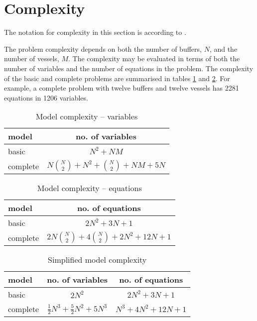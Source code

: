 \section{Complexity}\label{S.complexity}
The notation for complexity in this section is according to \citet{Knuth:1976}.

The problem complexity depends on both the number of buffers, $N$,
and the number of vessels, $M$.
The complexity may be evaluated in terms of both the number of variables and
the number of equations in the problem.
The complexity of the basic and complete problems are summarised in tables
\ref{tbl.complexity1} and \ref{tbl.complexity1b}.
For example, a complete problem with twelve buffers and twelve vessels has
\num{2281} equations in \num{1206} variables.
\begin{table}[t]
    \centering
    \caption{Model complexity -- variables}
    \label{tbl.complexity1}
    \begin{tabular}{l | c }
        model & no. of variables \\ \hline
        basic & $N^2 + NM$\\
        complete & $N {{N}\choose{2}} + N^2 + {{N}\choose{2}} + NM + 5N$\\
    \end{tabular}
\end{table}
\begin{table}[t]
    \centering
    \caption{Model complexity -- equations}
    \label{tbl.complexity1b}
    \begin{tabular}{l | c }
        model & no. of equations\\ \hline
        basic & $2N^2 + 3N + 1$\\
        complete  & $2N{{N}\choose{2}} + 4{{N}\choose{2}} + 2N^2 + 12N + 1$\\
    \end{tabular}
\end{table}
\begin{table}[t]
    \centering
    \caption{Simplified model complexity}
    \label{tbl.complexity2}
    \begin{tabular}{l | c | c}
        model & no. of variables & no. of equations\\ \hline
        basic & $2N^2$ & $2N^2 + 3N + 1$\\
        complete & $\tfrac{1}{2} N^{3} + \tfrac{5}{2} N^{2} + 5 N^{3}$
            & $N^{3} + 4 N^{2} + 12 N + 1$\\
    \end{tabular}
\end{table}

